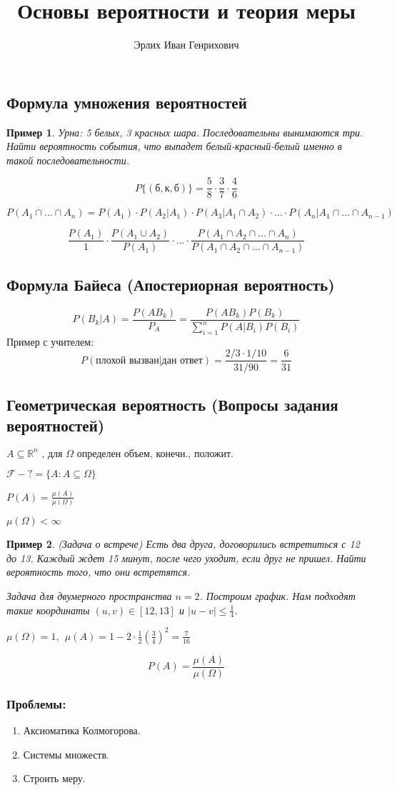 \documentclass{article}
\author{Эрлих Иван Генрихович}
\title{Основы вероятности и теория меры}
\newtheorem*{xmp}{Пример}
\begin{document}
\maketitle

\subsection*{Формула умножения вероятностей}
\begin{xmp}
  Урна: 5 белых, 3 красных шара. Последовательны вынимаются три. Найти вероятность события, что выпадет белый-красный-белый именно в такой последовательности.
  
  $$ P\{(\text{б},\text{к},\text{б})\} = \frac{5}{8} \cdot \frac{3}{7} \cdot \frac{4}{6} $$
  
  $$ P(A_1 \cap \ldots \cap A_n) = P(A_1) \cdot P(A_2|A_1) \cdot P(A_3|A_1 \cap A_2) \cdot \ldots \cdot P(A_n | A_1 \cap \ldots \cap A_{n-1}) $$
  
  $$ \frac{P(A_1)}{1} \cdot \frac{P(A_1 \cup A_2)}{P(A_1)} \cdot \ldots \cdot \frac{P(A_1 \cap A_2 \cap \ldots \cap A_n)}{P(A_1 \cap A_2 \cap \ldots \cap A_{n - 1})} $$
\end{xmp}

\subsection*{Формула Байеса (Апостериорная вероятность)}
$$ P(B_k | A) = \frac{P(AB_k)}{P_A} = \frac{P(AB_k)P(B_k)}{\sum\limits_{i=1}^{n} P(A|B_i) P(B_i)} $$
Пример с учителем:
$$ P (\text{плохой вызван} | \text{дан ответ} ) = \frac{2/3 \cdot 1/10}{31/90} = \frac{6}{31} $$

\subsection*{Геометрическая вероятность (Вопросы задания вероятностей)}

  $ A \subseteq \mathbb{R}^n \text{ , для $\Omega$ определен объем, конечн., положит.}$
  
  \noindent $ \mathcal{F} - ? = \{ A : A \subseteq \Omega\}$
  
  \noindent $ P(A) = \frac{\mu(A)}{\mu(\Omega)} $
  
  \noindent $ \mu(\Omega) < \infty $

\begin{xmp}(Задача о встрече)
Есть два друга, договорились встретиться с 12 до 13. Каждый ждет 15 минут, после чего уходит, если друг не пришел. Найти вероятность того, что они встретятся.

Задача для двумерного пространства $n = 2$. Построим график. Нам подходят такие координаты $(u, v) \in [12, 13]$ и $ |u - v| \leqslant \frac{1}{4} $.

$ \mu(\Omega) = 1,~~ \mu(A) = 1 - 2 \cdot \frac{1}{2} \left(\frac{3}{4}\right)^2 = \frac{7}{16} $
\end{xmp}

$$ P(A) = \frac{\mu(A)}{\mu(\Omega)} $$

\subsubsection*{Проблемы:}
\begin{enumerate}
\item Аксиоматика Колмогорова.
\item Системы множеств.
\item Строить меру.
\end{enumerate}
\end{document}
